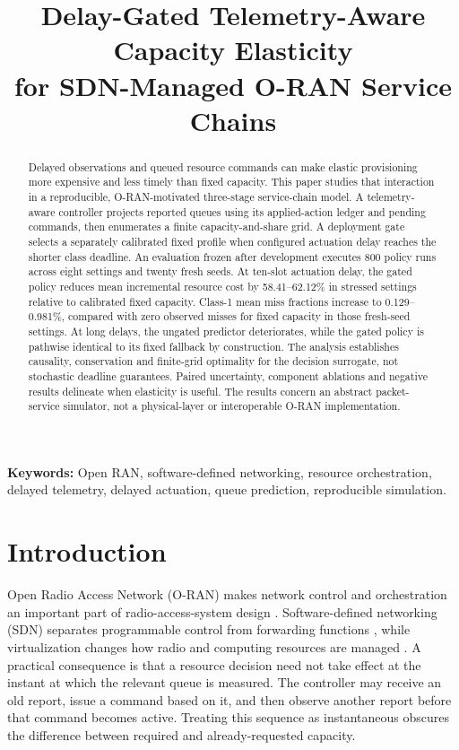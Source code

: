 \documentclass[10pt,a4paper]{article}
\title{Delay-Gated Telemetry-Aware Capacity Elasticity\\for SDN-Managed O-RAN Service Chains}
\author{}
\date{}
\begin{document}
\maketitle
\vspace{-12mm}
\begin{abstract}
Delayed observations and queued resource commands can make elastic provisioning
more expensive and less timely than fixed capacity. This paper studies that
interaction in a reproducible, O-RAN-motivated three-stage service-chain model.
A telemetry-aware controller projects reported queues using its applied-action
ledger and pending commands, then enumerates a finite capacity-and-share grid.
A deployment gate selects a separately calibrated fixed profile when configured
actuation delay reaches the shorter class deadline. An evaluation frozen after
development executes 800 policy runs across eight settings and twenty fresh seeds.
At ten-slot actuation delay, the gated policy reduces mean incremental resource
cost by 58.41--62.12\% in stressed settings relative to calibrated fixed capacity.
Class-1 mean miss fractions increase to 0.129--0.981\%, compared with zero observed misses for fixed capacity in those fresh-seed settings. At long delays, the ungated predictor deteriorates, while the
gated policy is pathwise identical to its fixed fallback by construction.
The analysis establishes causality, conservation and finite-grid optimality for
the decision surrogate, not stochastic deadline guarantees. Paired uncertainty,
component ablations and negative results delineate when elasticity is useful.
The results concern an abstract packet-service simulator, not a physical-layer
or interoperable O-RAN implementation.
\end{abstract}
\noindent\textbf{Keywords:} Open RAN, software-defined networking, resource orchestration,
delayed telemetry, delayed actuation, queue prediction, reproducible simulation.

\section{Introduction}
Open Radio Access Network (O-RAN) makes network control and orchestration an
important part of radio-access-system design \cite{polese}. Software-defined
networking (SDN) separates programmable control from forwarding functions
\cite{sdn}, while virtualization changes how radio and computing resources are
managed \cite{ecosystem}. A practical consequence is that a resource decision
need not take effect at the instant at which the relevant queue is measured.
The controller may receive an old report, issue a command based on it, and then
observe another report before that command becomes active. Treating this sequence
as instantaneous obscures the difference between required and already-requested
capacity.
\end{document}
